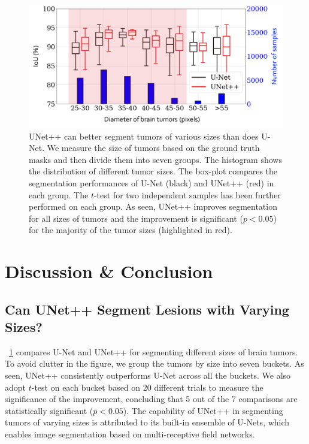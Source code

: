 \begin{figure}[t]
\begin{center}
\includegraphics[width=0.85\linewidth]{Figures/CH4/fig_physical_real_brain_tumor_size_stat.pdf}
\end{center}
\caption[UNet++ Can Segment Lesions with Varying Sizes]{
UNet++ can better segment tumors of various sizes than does U-Net. We measure the size of tumors based on the ground truth masks and then divide them into seven groups. The histogram shows the distribution of different tumor sizes. The box-plot compares the segmentation performances of U-Net (black) and UNet++ (red) in each group. The $t$-test for two independent samples has been further performed on each group. As seen, UNet++ improves segmentation for all sizes of tumors and the improvement is significant ($p<0.05$) for the majority of the tumor sizes (highlighted in red).}
\label{ch4:fig:multi_depth_improvement_brain_tumor}
\end{figure}


\section{Discussion \& Conclusion}
\label{ch4:discussion_conclusion}


\subsection{Can UNet++ Segment Lesions with Varying Sizes?}
\label{ch4:discussion_conclusion:stratified_lesion_sizes}

\figurename~\ref{ch4:fig:multi_depth_improvement_brain_tumor} compares U-Net and UNet++ for segmenting different sizes of brain tumors. To avoid clutter in the figure, we group the tumors by size into seven buckets. As seen, UNet++ consistently outperforms U-Net across all the buckets. We also adopt $t$-test on each bucket based on 20 different trials to measure the significance of the improvement, concluding that 5 out of the 7 comparisons are statistically significant ($p < 0.05$). The capability of UNet++ in segmenting tumors of varying sizes is attributed to its built-in ensemble of U-Nets, which enables image segmentation based on multi-receptive field networks.

